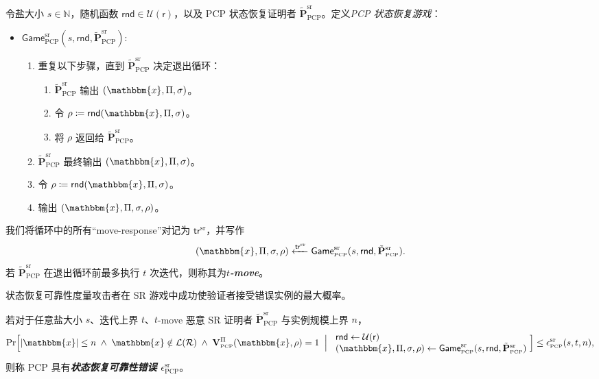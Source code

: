 \documentclass[american,singlepageview]{snargs-book-zh}
\newcommand{\defemph}[1]{\textbf{\emph{#1}}}
\newcommand{\Malicious}[1]{\tilde{#1}}
\newcommand{\DefineEqual}{\coloneqq}
\newcommand{\StateExperiment}[1]{
\!\begin{array}{l}
#1
\end{array}\!}
\newcommand{\SomeSize}[1]{|#1|}
\newcommand{\Naturals}{\mathbb{N}}
\newcommand{\Relation}{\mathcal{R}}
\newcommand{\Language}{\mathcal{L}}
\newcommand{\GetLanguage}[1]{\Language(#1)}
\newcommand{\Instance}{\mathbbm{x}}
\newcommand{\InstanceSize}{n}
\newcommand{\ProtoProver}{P}
\newcommand{\ProtoVerifier}{V}
\newcommand{\ProtoSoundnessError}{\epsilon}
\newcommand{\ProtoRandomnessComplexity}{\mathsf{r}}
\newcommand{\SRSuperscript}{\mathrm{sr}}
\newcommand{\ProtoSRSoundnessError}{\ProtoSoundnessError^{\SRSuperscript}}
\newcommand{\PCPSubscript}{\scriptscriptstyle\mathrm{PCP}}
\newcommand{\PCPFormat}[1]{\mathbf{#1}}
\newcommand{\PCPVerifier}{\PCPFormat{\ProtoVerifier}_{\PCPSubscript}}
\newcommand{\PCPMaliciousProver}{\Malicious{\PCPFormat{\ProtoProver}}_{\PCPSubscript}}
\newcommand{\PCPString}{\Pi}
\newcommand{\PCPVerifierRandomMessage}{\rho}
\newcommand{\PCPRandomnessComplexity}{\ProtoRandomnessComplexity}
\newcommand{\RODistribution}[1]{\mathcal{U}(#1)}
\newcommand{\ROTrace}{\mathsf{tr}}
\newcommand{\SRBudget}{t}
\newcommand{\SRSaltSize}{s}
\newcommand{\SRSaltString}{\sigma}
\newcommand{\SRRandomness}{\mathsf{rnd}}
\newcommand{\SRTrace}{\ROTrace^{\SRSuperscript}}
\newcommand{\SRGameName}[1]{\mathsf{Game}_{#1}^{\SRSuperscript}}
\newcommand{\PCPStateRestorationGame}[3]{\SRGameName{\PCPSubscript}(#1,#2,#3)}
\newcommand{\PCPSRSoundnessError}{\ProtoSRSoundnessError_{\PCPSubscript}}
\newcommand{\PCPMaliciousSRProver}{\PCPMaliciousProver^{\SRSuperscript}}
\begin{document}
\begin{definition}
\label{definition:pcp-state-restoration-game}
令盐大小 $\SRSaltSize\in\Naturals$，随机函数 $\SRRandomness\in\RODistribution{\PCPRandomnessComplexity}$，以及 PCP 状态恢复证明者 $\PCPMaliciousSRProver$。定义\emph{PCP 状态恢复游戏}：
\begin{itemize}[noitemsep]
\item[] $\PCPStateRestorationGame{\SRSaltSize}{\SRRandomness}{\PCPMaliciousSRProver}$:
\begin{enumerate}[nolistsep]
  \item 重复以下步骤，直到 $\PCPMaliciousSRProver$ 决定退出循环：
  \begin{enumerate}
    \item $\PCPMaliciousSRProver$ 输出 $(\Instance,\PCPString,\SRSaltString)$。
    \item 令 $\PCPVerifierRandomMessage \DefineEqual \SRRandomness(\Instance,\PCPString,\SRSaltString)$。
    \item 将 $\PCPVerifierRandomMessage$ 返回给 $\PCPMaliciousSRProver$。
  \end{enumerate}
  \item $\PCPMaliciousSRProver$ 最终输出 $(\Instance,\PCPString,\SRSaltString)$。
  \item 令 $\PCPVerifierRandomMessage \DefineEqual \SRRandomness(\Instance,\PCPString,\SRSaltString)$。
  \item 输出 $(\Instance,\PCPString,\SRSaltString,\PCPVerifierRandomMessage)$。
\end{enumerate}
\end{itemize}
我们将循环中的所有“move-response”对记为 $\SRTrace$，并写作
\[
(\Instance,\PCPString,\SRSaltString,\PCPVerifierRandomMessage)
\xleftarrow{\SRTrace}
\PCPStateRestorationGame{\SRSaltSize}{\SRRandomness}{\PCPMaliciousSRProver}.
\]
若 $\PCPMaliciousSRProver$ 在退出循环前最多执行 $\SRBudget$ 次迭代，则称其为\defemph{$\SRBudget$-move}。
\end{definition}

状态恢复可靠性度量攻击者在 SR 游戏中成功使验证者接受错误实例的最大概率。

\begin{definition}
\label{definition:pcp-state-restoration-soundness}
若对于任意盐大小 $\SRSaltSize$、迭代上界 $\SRBudget$、$\SRBudget$-move 恶意 SR 证明者 $\PCPMaliciousSRProver$ 与实例规模上界 $\InstanceSize$，
\[
\Pr\Bigl[
\SomeSize{\Instance}\le\InstanceSize
\;\land\;
\Instance\notin\GetLanguage{\Relation}
\;\land\;
\PCPVerifier^{\PCPString}(\Instance,\PCPVerifierRandomMessage)=1
\;\Bigm|\;
\StateExperiment{
  \SRRandomness\gets\RODistribution{\PCPRandomnessComplexity}\\
  (\Instance,\PCPString,\SRSaltString,\PCPVerifierRandomMessage)\gets
  \PCPStateRestorationGame{\SRSaltSize}{\SRRandomness}{\PCPMaliciousSRProver}
}
\Bigr]
\le
\PCPSRSoundnessError(\SRSaltSize,\SRBudget,\InstanceSize),
\]
则称 PCP 具有\defemph{状态恢复可靠性错误 $\PCPSRSoundnessError$}。
\end{definition}
\end{document}
